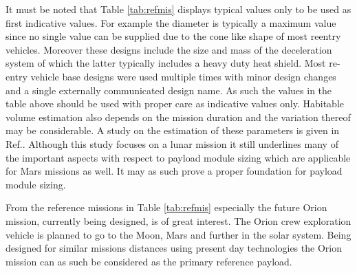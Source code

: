 It must be noted that Table \ref{tab:refmis} displays typical values only to be used as first indicative values. For example the diameter is typically a maximum value since no single value can be supplied due to the cone like shape of most reentry vehicles. Moreover these designs include the size and mass of the deceleration system of which the latter typically includes a heavy duty heat shield. Most re-entry vehicle base designs were used multiple times with minor design changes and a single externally communicated design name. As such the values in the table above should be used with proper care as indicative values only. Habitable volume estimation also depends on the mission duration and the variation thereof may be considerable. A study on the estimation of these parameters is given in Ref.\cite{Rudisill2008}. Although this study focuses on a lunar mission it still underlines many of the important aspects with respect to payload module sizing which are applicable for Mars missions as well. It may as such prove a proper foundation for payload module sizing. 

From the reference missions in Table \ref{tab:refmis} especially the future Orion mission, currently being designed, is of great interest. The Orion crew exploration vehicle is planned to go to the Moon, Mars and further in the solar system. Being designed for similar missions distances using present day technologies the Orion mission can as such be considered as the primary reference payload.


